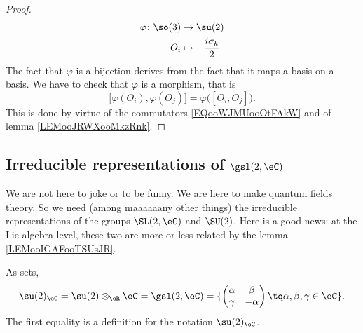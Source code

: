 \begin{proof}
\begin{equation}
\begin{aligned}
            \varphi\colon \so(3)&\to \su(2) \\
            O_i&\mapsto -\frac{ i\sigma_k }{ 2 }. 
        \end{aligned}
    \end{equation}
    The fact that \( \varphi\) is a bijection derives from the fact that it maps a basis on a basis. We have to check that \( \varphi\) is a morphism, that is
    \begin{equation}
        \big[ \varphi(O_i),\varphi(O_j) \big]=\varphi\big( [O_i,O_j] \big).
    \end{equation}
    This is done by virtue of the commutators \eqref{EQooWJMUooOtFAkW} and of lemma \ref{LEMooJRWXooMkzRnk}.
\end{proof}

\subsection{Irreducible representations of \texorpdfstring{$\gsl(2,\eC)$}{sl(2,C)}}

We are not here to joke or to be funny. We are here to make quantum fields theory. So we need (among maaaaaany other things) the irreducible representations of the groups \( \SL(2,\eC)\) and \( \SU(2)\). Here is a good news: at the Lie algebra level, these two are more or less related by the lemma \ref{LEMooIGAFooTSUsJR}.

\begin{lemma}     \label{LEMooVEJZooUVNdmE}
    As sets,
    \begin{equation}
        \su(2)_{\eC}=\su(2)\otimes_{\eR}\eC=\gsl(2,\eC)=\{ \begin{pmatrix}
        \alpha    &   \beta    \\ 
    \gamma    &   -\alpha    
\end{pmatrix}\tq \alpha,\beta,\gamma\in \eC\}.
    \end{equation}
    The first equality is a definition for the notation \( \su(2)_{\eC}\).
\end{lemma}

